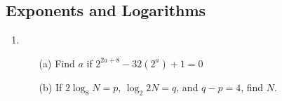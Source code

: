 \subsection{Exponents and Logarithms}

\begin{enumerate}
	\item 
	\begin{enumerate}[topsep=0ex,itemsep=0ex,partopsep=1ex,parsep=1ex]
		\item[(a)] Find $a$ if $2^{2a + 8} - 32(2^a) + 1 = 0$
		
		\item[(b)] If $2\log_8{N} = p$, $\log_2{2N} = q$, and $q - p = 4$, find $N$.
	\end{enumerate}
	
\end{enumerate}











